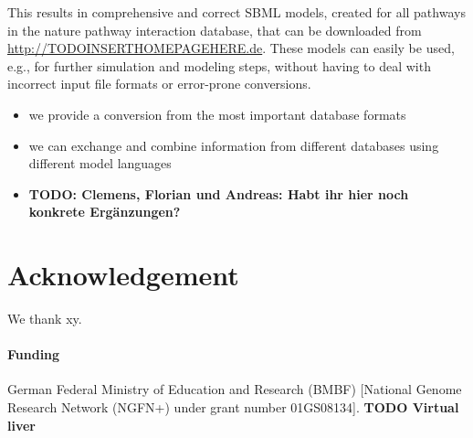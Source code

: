 \documentclass{bioinfo}
\begin{document}
This results in comprehensive and correct SBML models, created for all pathways in the nature pathway interaction database, that can be downloaded from \href{http://TODO_INSERT_HOMEPAGE_HERE.de}{http://TODOINSERTHOMEPAGEHERE.de}. These models can easily be used, e.g., for further simulation and modeling steps, without having to deal with incorrect input file formats or error-prone conversions.


\begin{itemize}
\item we provide a conversion from the most important database formats
\item we can exchange and combine information from different databases using different model languages
\item \textbf{TODO: Clemens, Florian und Andreas: Habt ihr hier noch konkrete Erg\"anzungen?}
\end{itemize}


\section*{Acknowledgement}
We thank xy.

\paragraph{Funding\textcolon} German Federal Ministry of Education and Research (BMBF) [National Genome Research Network (NGFN+) under grant number 01GS08134]. \textbf{TODO Virtual liver}


%
%
%
%
%
%

\end{document}
